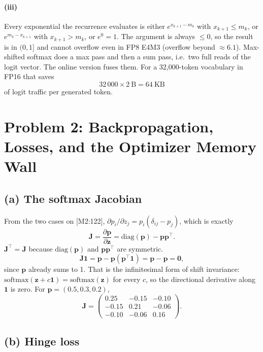 \documentclass[11pt]{article}
\newcommand{\vct}[1]{\mathbf{#1}}
\newcommand{\mat}[1]{\mathbf{#1}}
\begin{document}
\paragraph{(iii)}
Every exponential the recurrence evaluates is either
\(e^{x_{k+1}-m_k}\) with \(x_{k+1}\le m_k\), or
\(e^{m_k-x_{k+1}}\) with \(x_{k+1}>m_k\), or \(e^0=1\).
The argument is always \(\le 0\), so the result is in \((0,1]\) and
cannot overflow even in FP8 E4M3 (overflow beyond \(\approx 6.1\)).
Max-shifted softmax does a max pass and then a sum pass, i.e.\ two
full reads of the logit vector. The online version fuses them.
For a 32{,}000-token vocabulary in FP16 that saves
\[
32\,000\times 2\ \text{B}=64\ \text{KB}
\]
of logit traffic per generated token.

\section{Problem 2: Backpropagation, Losses, and the Optimizer Memory Wall}

\subsection*{(a) The softmax Jacobian}

From the two cases on [M2:122],
\(\partial p_i/\partial z_j=p_i(\delta_{ij}-p_j)\), which is exactly
\[
\mat{J}=\frac{\partial\vct{p}}{\partial\vct{z}}=\mathrm{diag}(\vct{p})-\vct{p}\vct{p}^\top.
\]
\(\mat{J}^\top=\mat{J}\) because \(\mathrm{diag}(\vct{p})\) and
\(\vct{p}\vct{p}^\top\) are symmetric.
\[
\mat{J}\vct{1}
=\vct{p}-\vct{p}(\vct{p}^\top\vct{1})
=\vct{p}-\vct{p}=\vct{0},
\]
since \(\vct{p}\) already sums to 1. That is the infinitesimal form of
shift invariance: \(\mathrm{softmax}(\vct{z}+c\vct{1})=\mathrm{softmax}(\vct{z})\)
for every \(c\), so the directional derivative along \(\vct{1}\) is zero.
For \(\vct{p}=(0.5,0.3,0.2)\),
\[
\mat{J}
=
\begin{pmatrix}
0.25 & -0.15 & -0.10 \\
-0.15 & 0.21 & -0.06 \\
-0.10 & -0.06 & 0.16
\end{pmatrix}.
\]

\subsection*{(b) Hinge loss}
\end{document}
